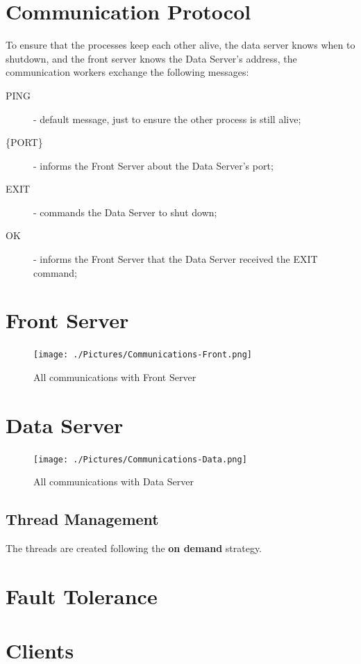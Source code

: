 \documentclass[12pt]{article} %
\begin{document}
\section{Communication Protocol}
\label{sec:CommunicationProtocol}
To ensure that the processes keep each other alive, the data server knows when to shutdown, and the front server knows the Data Server's address, 
the communication workers exchange the following messages:
  \begin{description}
    \item[PING] - default message, just to ensure the other process is still alive;
    \item[\{PORT\}] - informs the Front Server about the Data Server's port;
    \item[EXIT] - commands the Data Server to shut down;
    \item[OK] - informs the Front Server that the Data Server received the EXIT command;
  \end{description}


\section{Front Server}
\label{sec:FrontServer}

\begin{figure}[H]
\centering
\texttt{[image: ./Pictures/Communications-Front.png]}
\caption{All communications with Front Server}\label{fig:CommunicationsFront}
\end{figure}

\section{Data Server}
\label{sec:DataServer}

\begin{figure}[H]
\centering
\texttt{[image: ./Pictures/Communications-Data.png]}
\caption{All communications with Data Server}\label{fig:CommunicationsData}
\end{figure}

\subsection{Thread Management}
\label{sub:ThreadManagement}

The threads are created following the \textbf{on demand} strategy.

\section{Fault Tolerance}
\label{sec:FaultTolerance}

\section{Clients}
\label{sec:Clients}
\end{document}
